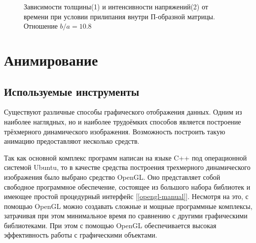 				\begin{figure}[h!]	
				\def\svgwidth{\columnwidth}
				\caption{Зависимости толщины(1) и интенсивности напряжений(2) от времени при условии прилипания внутри П-образной матрицы. Отношение $b/a = 10.8$} 
				\label{vert_stick_10ba}
		\end{figure}

\clearpage

\section{Анимирование}
\subsection{Используемые инструменты}
Существуют различные способы графического отображения данных. Одним из наиболее наглядных,
 но и наиболее трудоёмких  способов является построение трёхмерного динамического изображения. 
 Возможность построить такую анимацию предоставляют несколько средств.
 	 
  Так как основной комплекс программ написан на языке C++ под операционной системой Ubuntu, 
   то в качестве средства построения трехмерного динамического изображения было выбрано
средство OpenGL.  Оно представляет собой свободное программное обеспечение, состоящее 
из большого набора библиотек и имеющее простой процедурный интерфейс [\ref{opengl-manual}]. 
Несмотря на это, с  помощью OpenGL можно создавать сложные и мощные программные 
комплексы, затрачивая при 
этом минимальное время по сравнению с другими графическими библиотеками. При этом с 
помощью OpenGL обеспечивается высокая эффективность работы с графическими объектами.

